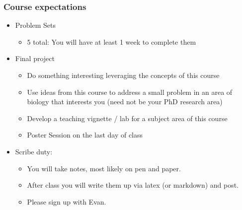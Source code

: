 \documentclass[10pt,containsverbatim,paralist]{article}
\begin{document}
\subsubsection*{Course expectations}
\label{sec-1-1-2}
\begin{itemize}
\item Problem Sets
\label{sec-1-1-2-1}
\begin{itemize}
\item 5 total: You will have at least 1 week to complete them
\label{sec-1-1-2-1-1}
\end{itemize}
\item Final project
\label{sec-1-1-2-2}
\begin{itemize}
\item Do something interesting leveraging the concepts of this course
\item Use ideas from this course to address a small problem in an area of biology that interests you (need not be your PhD research area)
\item Develop a teaching vignette / lab for a subject area of this course
\item Poster Session on the last day of class
\end{itemize}
\item Scribe duty:
\label{sec-1-1-2-3}
\begin{itemize}
\item You will take notes, most likely on pen and paper.
\item After class you will write them up via latex (or markdown) and post.
\item Please sign up with Evan.
\end{itemize}
\end{itemize}
\end{document}
